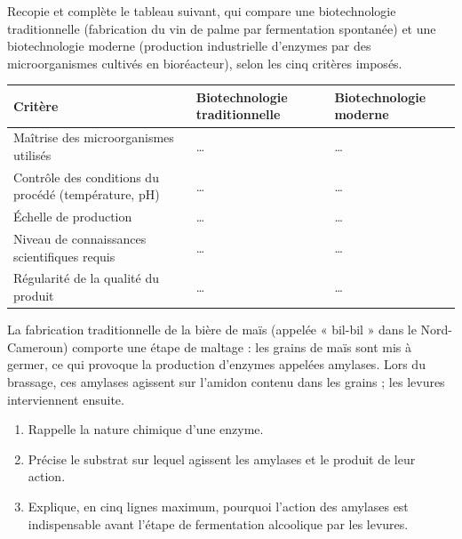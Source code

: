 \documentclass[11pt]{article}
\newcommand{\cle}[1]{{\popxbold\color{popdark}#1}}
\begin{document}
\begin{exercice}
Recopie et complète le tableau suivant, qui compare une biotechnologie traditionnelle (fabrication du vin de palme par fermentation spontanée) et une biotechnologie moderne (production industrielle d'enzymes par des microorganismes cultivés en bioréacteur), selon les cinq critères imposés.

\begin{center}
\begin{tabularx}{\linewidth}{|l|X|X|}
\hline
\rowcolor{popblueL} \textbf{Critère} & \textbf{Biotechnologie traditionnelle} & \textbf{Biotechnologie moderne} \\
\hline
Maîtrise des microorganismes utilisés & \dots & \dots \\
\hline
Contrôle des conditions du procédé (température, pH) & \dots & \dots \\
\hline
Échelle de production & \dots & \dots \\
\hline
Niveau de connaissances scientifiques requis & \dots & \dots \\
\hline
Régularité de la qualité du produit & \dots & \dots \\
\hline
\end{tabularx}
\end{center}
\end{exercice}

\begin{exercice}
La fabrication traditionnelle de la bière de maïs (appelée « bil-bil » dans le Nord-Cameroun) comporte une étape de maltage : les grains de maïs sont mis à germer, ce qui provoque la production d'enzymes appelées \cle{amylases}. Lors du brassage, ces amylases agissent sur l'amidon contenu dans les grains ; les levures interviennent ensuite.

\begin{enumerate}
\item Rappelle la nature chimique d'une enzyme.
\item Précise le substrat sur lequel agissent les amylases et le produit de leur action.
\item Explique, en cinq lignes maximum, pourquoi l'action des amylases est indispensable avant l'étape de fermentation alcoolique par les levures.
\end{enumerate}
\end{exercice}
\end{document}
